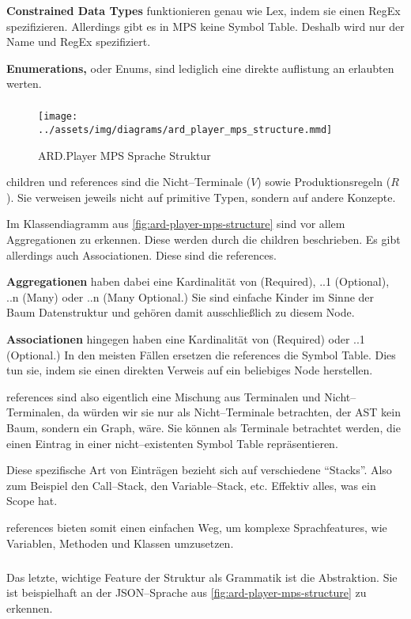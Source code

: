\textbf{Constrained Data Types} funktionieren genau wie Lex, indem sie einen \ac{RegEx} spezifizieren.
Allerdings gibt es in \ac{MPS} keine Symbol Table.
Deshalb wird nur der Name und \ac{RegEx} spezifiziert.

\textbf{Enumerations,} oder Enums, sind lediglich eine direkte auflistung an erlaubten werten.

\subparagraph*{}
\begin{figure}
    \texttt{[image: ../assets/img/diagrams/ard\_player\_mps\_structure.mmd]}
    \caption{ARD.Player MPS Sprache Struktur}
    \label{fig:ard-player-mps-structure}
\end{figure}
{\ttfamily children} und {\ttfamily references} sind die Nicht--Terminale ($V$) sowie Produktionsregeln ($R$).
Sie verweisen jeweils nicht auf primitive Typen, sondern auf andere Konzepte.

Im Klassendiagramm aus \autoref{fig:ard-player-mps-structure} sind vor allem Aggregationen zu erkennen.
Diese werden durch die {\ttfamily children} beschrieben.
Es gibt allerdings auch Associationen.
Diese sind die {\ttfamily references}.

\textbf{Aggregationen} haben dabei eine Kardinalität von {} (Required), {..1} (Optional), {..n} (Many) oder {..n} (Many Optional.)
Sie sind einfache Kinder im Sinne der Baum Datenstruktur und gehören damit ausschließlich zu diesem Node.

\textbf{Associationen} hingegen haben eine Kardinalität von {} (Required) oder {..1} (Optional.)
In den meisten Fällen ersetzen die {\ttfamily references} die Symbol Table.
Dies tun sie, indem sie einen direkten Verweis auf ein beliebiges Node herstellen.

{\ttfamily references} sind also eigentlich eine Mischung aus Terminalen und Nicht--Terminalen, da würden wir sie nur als Nicht--Terminale betrachten, der \ac{AST} kein Baum, sondern ein Graph, wäre.
Sie können als Terminale betrachtet werden, die einen Eintrag in einer nicht--existenten Symbol Table repräsentieren.

Diese spezifische Art von Einträgen bezieht sich auf verschiedene \enquote{Stacks}.
Also zum Beispiel den Call--Stack, den Variable--Stack, etc.
Effektiv alles, was ein Scope hat.

{\ttfamily references} bieten somit einen einfachen Weg, um komplexe Sprachfeatures, wie Variablen, Methoden und Klassen umzusetzen.

\subparagraph*{}
Das letzte, wichtige Feature der Struktur als Grammatik ist die Abstraktion.
Sie ist beispielhaft an der \ac{JSON}--Sprache aus \autoref{fig:ard-player-mps-structure} zu erkennen.

